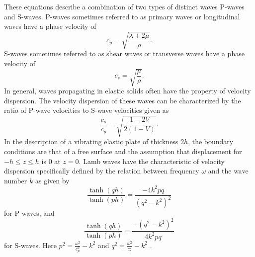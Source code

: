 \documentclass[twoside]{bsu-ms}
\begin{document}
These equations describe a combination of two types of distinct waves P-waves and S-waves. P-waves sometimes referred to as primary waves or longitudinal waves have a phase velocity of
\begin{equation}\label{eq:1.10}
    c_{p}=\sqrt{\frac{\lambda+2\mu}{\rho}}.
\end{equation}
S-waves sometimes referred to as shear waves or transverse waves have a phase velocity of
\begin{equation}\label{eq:1.11}
	c_{s}=\sqrt{\frac{\mu}{\rho}}.
\end{equation}
In general, waves propagating in elastic solids often have the property of velocity dispersion. The velocity dispersion of these waves can be characterized by the ratio of P-wave velocities to S-wave velocities given as
\begin{equation}\label{eq:1.12}
    \frac{c_{s}}{c_{p}}=\sqrt{\frac{1-2V}{2(1-V)}}.
\end{equation}
In the description of a vibrating elastic plate of thickness $2h$, the boundary conditions are that of a free surface and the assumption that displacement for $-h\leq z\leq h$ is $0$ at $z=0$. Lamb waves have the characteristic of velocity dispersion specifically defined by the relation between frequency $\omega$ and the wave number $k$ as given by 
\begin{equation}\label{eq:1.13}
    \frac{\tanh\left(q h\right)}{\tanh\left(p h\right)}=\frac{-4 k^2pq}{\left(q^2-k^2\right)^2}
\end{equation}
for P-waves, and 
\begin{equation}\label{eq:1.14}
    \frac{\tanh\left(q h\right)}{\tanh\left(p h\right)}=\frac{-\left(q^2-k^2\right)^2}{4 k^2pq}
\end{equation}
for S-waves. Here $p^{2}=\frac{\omega^{2}}{c^{2}_{p}}-k^2$ and $q^{2}=\frac{\omega^{2}}{c^{2}_{s}}-k^2$ \cite{pant2014derivation}.
\end{document}
